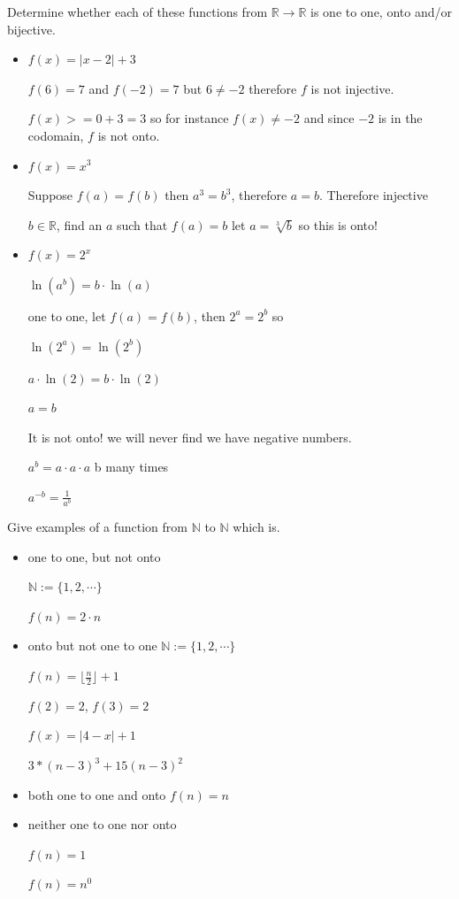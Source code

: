 \begin{exmp}
Determine whether each of these functions from $\mathbb{R} \to \mathbb{R}$ is one to one, onto and/or bijective.
\begin{itemize}
\item $f(x)=|x-2|+3$

$f(6)=7$ and $f(-2)=7$ but $6\neq -2 $ therefore $f$ is not injective. 


$f(x)>=0+3=3$ so for instance $f(x)\neq -2$ and since $-2$ is in the codomain, $f$ is not onto.

\item $f(x)=x^3$

Suppose $f(a)=f(b)$ then $a^3=b^3$, therefore $a=b$. Therefore injective

$b \in \mathbb{R}$, find an $a$ such that $f(a)=b$ let $a= \sqrt[3]{b}$ so this is onto!

\item $f(x)=2^x$


$\ln(a^b)=b\cdot \ln(a)$


one to one, let $f(a)=f(b)$, then $2^a=2^b$
so 

$\ln(2^a)=\ln(2^b)$

$a \cdot \ln(2)=b \cdot \ln(2)$

$a=b$

It is not onto! we will never find we have negative numbers.

$a^b=a\cdot a\cdot a$ b many times

$a^{-b}=\frac{1}{a^b}$


\end{itemize}
\end{exmp}
\begin{exmp}
Give examples of a function from $\mathbb{N}$ to $\mathbb{N}$ which is.
\begin{itemize}
\item one to one, but not onto

$\mathbb{N}:=\{1,2, \cdots \}$

$f(n)=2\cdot n$

\item onto but not one to one
$\mathbb{N}:=\{1,2, \cdots \}$

$f(n)=\lfloor \frac{n}{2} \rfloor+1$

$f(2)=2$, $f(3)=2$

$f(x)=|4-x|+1$


$3*(n-3)^3+15(n-3)^2$

\item both one to one and onto
$f(n)=n$



\item neither one to one nor onto

$f(n)=1$

$f(n)=n^0$
\vspace{1cm}
\end{itemize}
\end{exmp}
